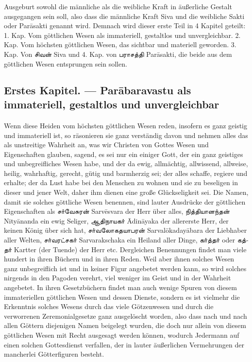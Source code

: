 \documentclass{article}
\newcommand{\TamilText}[1]{\texttamil{#1}}
\newcommand{\tam}[1]{\TamilText{#1}}
\begin{document}
Ausgeburt sowohl die männliche als die weibliche Kraft in äußerliche Gestalt ausgegangen sein soll, also dass die männliche Kraft Siva und die weibliche Sakti oder Par\={a}sakti genannt wird. Demnach wird dieser erste Teil in 4 Kapitel geteilt: 1. Kap. Vom göttlichen Wesen als immateriell, gestaltlos und unvergleichbar. 2. Kap. Vom höchsten göttlichen Wesen, das sichtbar und materiell geworden. 3. Kap. Von \tam{சிவன்} Siva und 4. Kap. von \tam{பராசத்தி} Par\={a}sakti, die beide aus dem göttlichen Wesen entsprungen sein sollen.

\clearpage
\subsection{Erstes Kapitel. — Par\={a}baravastu als immateriell, gestaltlos und unvergleichbar}
\paragraph{}
Wenn diese Heiden vom höchsten göttlichen Wesen reden, insofern es ganz geistig und immateriell ist, so räsonieren sie ganz verständig davon und nehmen alles das als unstreitige Wahrheit an, was wir Christen von Gottes Wesen und Eigenschaften glauben, sagend, es sei nur ein einiger Gott, der ein ganz geistiges und unbegreifliches Wesen habe, und der da ewig, allmächtig, allwissend, allweise, heilig, wahrhaftig, gerecht, gütig und barmherzig sei; der alles schaffe, regiere und erhalte; der da Lust habe bei den Menschen zu wohnen und sie zu beseligen in dieser und jener Welt, daher ihm dienen eine große Glückseligkeit sei. Die Namen, damit sie solches göttliche Wesen benennen, sind lauter Ausdrücke der göttlichen Eigenschaften als \tam{சா்வேசுரன்} Sarv\={e}svara der Herr über alles, \tam{நித்தியானந்தன்} Nity\={a}nanda ein ewig Seliger, \tam{ஆதிநாயகா்} \={A}din\={a}yaka der allererste Herr, der keinen König über sich hat, \tam{சா்வலோகதயாபரன்} Sarval\={o}kaday\={a}bara der Liebhaber aller Welten, \tam{சா்வரட்சகா்} Sarvarakschaka ein Heiland aller Dinge, \tam{கா்த்தா்} oder \tam{கத்தா்} Kartter (der Tuende) der Herr etc. Dergleichen Benennungen findet man viele hundert in ihren Büchern und in ihren Reden. Weil aber ihnen solches Wesen ganz unbegreiflich ist und in keiner Figur angebetet werden kann, so wird solches nirgends in den Pagoden verehrt, viel weniger im Geist und in der Wahrheit angebetet. In ihren Gesetzbüchern findet man auch wenige Spuren von diesem immateriellen göttlichen Wesen und dessen Dienste, sondern es ist vielmehr die Erkenntnis solches Wesens durch das viele Götzenwesen und durch die verworrenen Zeremonialgesetze ganz ausgelöscht worden, also dass nach und nach allen Göttern diejenigen Namen beigelegt wurden, die doch nur allein von diesem göttlichen Wesen mit Recht ausgesagt werden können, wodurch Jedermann auf einen solchen Gottesdienst verfallen, der in lauter äußerlichen Vermehrungen der mancherlei Götterfiguren besteht.
\end{document}
